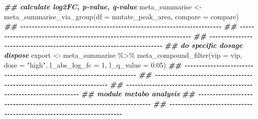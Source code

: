 \documentclass[
]{article}
\newenvironment{Shaded}{\begin{snugshade}}{\end{snugshade}}
\newcommand{\AttributeTok}[1]{\textcolor[rgb]{0.77,0.63,0.00}{#1}}
\newcommand{\DecValTok}[1]{\textcolor[rgb]{0.00,0.00,0.81}{#1}}
\newcommand{\DocumentationTok}[1]{\textcolor[rgb]{0.56,0.35,0.01}{\textbf{\textit{#1}}}}
\newcommand{\FloatTok}[1]{\textcolor[rgb]{0.00,0.00,0.81}{#1}}
\newcommand{\FunctionTok}[1]{\textcolor[rgb]{0.00,0.00,0.00}{#1}}
\newcommand{\NormalTok}[1]{#1}
\newcommand{\OtherTok}[1]{\textcolor[rgb]{0.56,0.35,0.01}{#1}}
\newcommand{\SpecialCharTok}[1]{\textcolor[rgb]{0.00,0.00,0.00}{#1}}
\newcommand{\StringTok}[1]{\textcolor[rgb]{0.31,0.60,0.02}{#1}}
\begin{document}
\begin{Shaded}
\begin{Highlighting}[]
\DocumentationTok{\#\# calculate log2FC, p{-}value, q{-}value}
\NormalTok{meta\_summarise }\OtherTok{\textless{}{-}} \FunctionTok{meta\_summarise\_via\_group}\NormalTok{(}\AttributeTok{df =}\NormalTok{ mutate\_peak\_area, }\AttributeTok{compare =}\NormalTok{ compare)}
\DocumentationTok{\#\# {-}{-}{-}{-}{-}{-}{-}{-}{-}{-}{-}{-}{-}{-}{-}{-}{-}{-}{-}{-}{-}{-}{-}{-}{-}{-}{-}{-}{-}{-}{-}{-}{-}{-}{-}{-}{-}{-}{-}{-}{-}{-}{-}{-}{-}{-}{-}{-}{-}{-}{-}{-}{-}{-}{-}{-}{-}{-}{-}{-}{-}{-}{-}{-}{-}{-}{-}{-}{-}{-} }
\DocumentationTok{\#\# {-}{-}{-}{-}{-}{-}{-}{-}{-}{-}{-}{-}{-}{-}{-}{-}{-}{-}{-}{-}{-}{-}{-}{-}{-}{-}{-}{-}{-}{-}{-}{-}{-}{-}{-}{-}{-}{-}{-}{-}{-}{-}{-}{-}{-}{-}{-}{-}{-}{-}{-}{-}{-}{-}{-}{-}{-}{-}{-}{-}{-}{-}{-}{-}{-}{-}{-}{-}{-}{-} }
\DocumentationTok{\#\# {-}{-}{-}{-}{-}{-}{-}{-}{-}{-}{-}{-}{-}{-}{-}{-}{-}{-}{-}{-}{-}{-}{-}{-}{-}{-}{-}{-}{-}{-}{-}{-}{-}{-}{-}{-}{-}{-}{-}{-}{-}{-}{-}{-}{-}{-}{-}{-}{-}{-}{-}{-}{-}{-}{-}{-}{-}{-}{-}{-}{-}{-}{-}{-}{-}{-}{-}{-}{-}{-} }
\DocumentationTok{\#\# do specific dosage dispose}
\NormalTok{export }\OtherTok{\textless{}{-}}\NormalTok{ meta\_summarise }\SpecialCharTok{\%\textgreater{}\%}
  \FunctionTok{meta\_compound\_filter}\NormalTok{(}\AttributeTok{vip =}\NormalTok{ vip, }\AttributeTok{dose =} \StringTok{"high"}\NormalTok{,}
                       \AttributeTok{l\_abs\_log\_fc =} \DecValTok{1}\NormalTok{, }\AttributeTok{l\_q\_value =} \FloatTok{0.05}\NormalTok{)}
\DocumentationTok{\#\# {-}{-}{-}{-}{-}{-}{-}{-}{-}{-}{-}{-}{-}{-}{-}{-}{-}{-}{-}{-}{-}{-}{-}{-}{-}{-}{-}{-}{-}{-}{-}{-}{-}{-}{-}{-}{-}{-}{-}{-}{-}{-}{-}{-}{-}{-}{-}{-}{-}{-}{-}{-}{-}{-}{-}{-}{-}{-}{-}{-}{-}{-}{-}{-}{-}{-}{-}{-}{-}{-}}
\DocumentationTok{\#\# {-}{-}{-}{-}{-}{-}{-}{-}{-}{-}{-}{-}{-}{-}{-}{-}{-}{-}{-}{-}{-}{-}{-}{-}{-}{-}{-}{-}{-}{-}{-}{-}{-}{-}{-}{-}{-}{-}{-}{-}{-}{-}{-}{-}{-}{-}{-}{-}{-}{-}{-}{-}{-}{-}{-}{-}{-}{-}{-}{-}{-}{-}{-}{-}{-}{-}{-}{-}{-}{-}}
\DocumentationTok{\#\# {-}{-}{-}{-}{-}{-}{-}{-}{-}{-}{-}{-}{-}{-}{-}{-}{-}{-}{-}{-}{-}{-}{-}{-}{-}{-}{-}{-}{-}{-}{-}{-}{-}{-}{-}{-}{-}{-}{-}{-}{-}{-}{-}{-}{-}{-}{-}{-}{-}{-}{-}{-}{-}{-}{-}{-}{-}{-}{-}{-}{-}{-}{-}{-}{-}{-}{-}{-}{-}{-}}
\DocumentationTok{\#\# module metabo analysis}
\DocumentationTok{\#\# {-}{-}{-}{-}{-}{-}{-}{-}{-}{-}{-}{-}{-}{-}{-}{-}{-}{-}{-}{-}{-}{-}{-}{-}{-}{-}{-}{-}{-}{-}{-}{-}{-}{-}{-}{-}{-}{-}{-}{-}{-}{-}{-}{-}{-}{-}{-}{-}{-}{-}{-}{-}{-}{-}{-}{-}{-}{-}{-}{-}{-}{-}{-}{-}{-}{-}{-}{-}{-}{-} }
\DocumentationTok{\#\# {-}{-}{-}{-}{-}{-}{-}{-}{-}{-}{-}{-}{-}{-}{-}{-}{-}{-}{-}{-}{-}{-}{-}{-}{-}{-}{-}{-}{-}{-}{-}{-}{-}{-}{-}{-}{-}{-}{-}{-}{-}{-}{-}{-}{-}{-}{-}{-}{-}{-}{-}{-}{-}{-}{-}{-}{-}{-}{-}{-}{-}{-}{-}{-}{-}{-}{-}{-}{-}{-} }

\end{Highlighting}
\end{Shaded}
\end{document}
